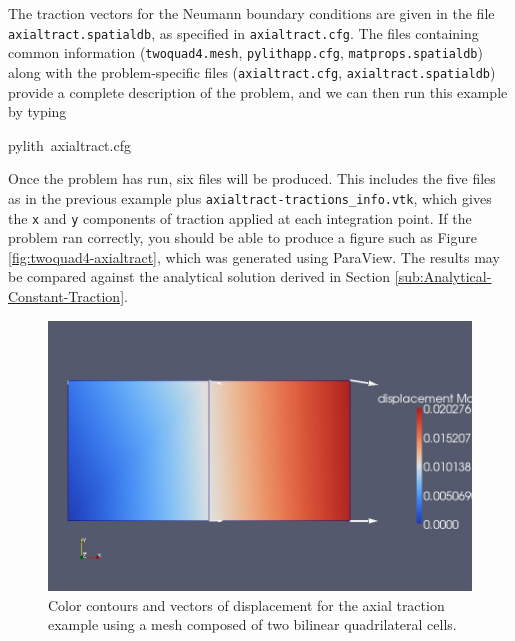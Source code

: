 The traction vectors for the Neumann boundary conditions are given
in the file \texttt{axialtract.spatialdb}, as specified in \texttt{axialtract.cfg}.
The files containing common information (\texttt{twoquad4.mesh}, \texttt{pylithapp.cfg},
\texttt{matprops.spatialdb}) along with the problem-specific files
(\texttt{axialtract.cfg}, \texttt{axialtract.spatialdb}) provide a
complete description of the problem, and we can then run this example
by typing
\begin{lyxcode}
pylith~axialtract.cfg
\end{lyxcode}
Once the problem has run, six files will be produced. This includes
the five files as in the previous example plus \texttt{axialtract-tractions\_info.vtk},
which gives the \texttt{x} and \texttt{y} components of traction applied
at each integration point. If the problem ran correctly, you should
be able to produce a figure such as Figure \vref{fig:twoquad4-axialtract},
which was generated using ParaView. The results may be compared against
the analytical solution derived in Section \vref{sub:Analytical-Constant-Traction}.

\begin{figure}
\begin{centering}
\includegraphics[scale=0.33]{tutorials/twocells/figs/twoquad4-axialtract}
\par\end{centering}

\caption{Color contours and vectors of displacement for the axial traction
example using a mesh composed of two bilinear quadrilateral cells.\label{fig:twoquad4-axialtract}}
\end{figure}

